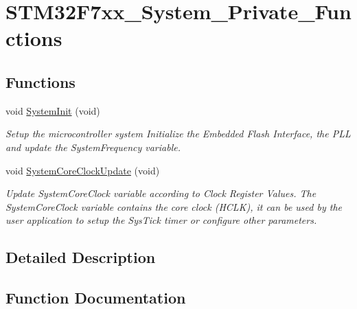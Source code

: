 \hypertarget{group___s_t_m32_f7xx___system___private___functions}{}\section{S\+T\+M32\+F7xx\+\_\+\+System\+\_\+\+Private\+\_\+\+Functions}
\label{group___s_t_m32_f7xx___system___private___functions}
\subsection*{Functions}
\begin{DoxyCompactItemize}
\item 
void \hyperlink{group___s_t_m32_f7xx___system___private___functions_ga93f514700ccf00d08dbdcff7f1224eb2}{System\+Init} (void)
\begin{DoxyCompactList}\small\item\em Setup the microcontroller system Initialize the Embedded Flash Interface, the P\+LL and update the System\+Frequency variable. \end{DoxyCompactList}\item 
void \hyperlink{group___s_t_m32_f7xx___system___private___functions_gae0c36a9591fe6e9c45ecb21a794f0f0f}{System\+Core\+Clock\+Update} (void)
\begin{DoxyCompactList}\small\item\em Update System\+Core\+Clock variable according to Clock Register Values. The System\+Core\+Clock variable contains the core clock (H\+C\+LK), it can be used by the user application to setup the Sys\+Tick timer or configure other parameters. \end{DoxyCompactList}\end{DoxyCompactItemize}


\subsection{Detailed Description}


\subsection{Function Documentation}
\mbox{\label{group___s_t_m32_f7xx___system___private___functions_gae0c36a9591fe6e9c45ecb21a794f0f0f}} 
